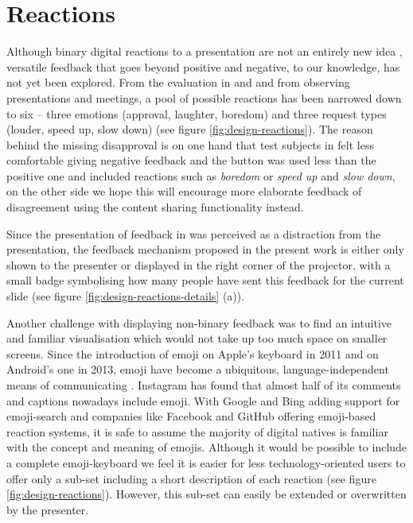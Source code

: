 \section{Reactions}
\label{sec:design-reactions}
Although binary digital reactions to a presentation are not an entirely new idea \cite{Teevan:MobileFeedbackDuringPresentation}, versatile feedback that goes beyond positive and negative, to our knowledge, has not yet been explored. From the evaluation in \cite{Teevan:MobileFeedbackDuringPresentation} and \cite{Isaacs:InteractivePresentationsDistributedAudience} and from observing presentations and meetings, a pool of possible reactions has been narrowed down to six --  three emotions (approval, laughter, boredom) and three request types (louder, speed up, slow down) (see figure \ref{fig:design-reactions}). The reason behind the missing disapproval is on one hand that test subjects in \cite{Teevan:MobileFeedbackDuringPresentation} felt less comfortable giving negative feedback and the button was used less than the positive one and included reactions such as \emph{boredom} or \emph{speed up} and \emph{slow down}, on the other side we hope this will encourage more elaborate feedback of disagreement using the content sharing functionality instead.

Since the presentation of feedback in \cite{Teevan:MobileFeedbackDuringPresentation} was perceived as a distraction from the presentation, the feedback mechanism proposed in the present work is either only shown to the presenter or displayed in the right corner of the projector, with a small badge symbolising how many people have sent this feedback for the current slide (see figure \ref{fig:design-reactions-details} (a)).

Another challenge with displaying non-binary feedback was to find an intuitive and familiar visualisation which would not take up too much space on smaller screens. Since the introduction of emoji on Apple's keyboard in 2011 and on Android's one in 2013, emoji have become a ubiquitous, language-independent means of communicating \cite{Instagramm:Emoji, Cappallo:EmojiVideoSearch}. Instagram has found that almost half of its comments and captions nowadays include emoji. With Google \cite{Google:Emoji} and Bing \cite{Bing:Emoji} adding support for emoji-search and companies like Facebook \cite{Facebook:Reactions} and GitHub \cite{Github:Reactions} offering emoji-based reaction systems, it is safe to assume the majority of digital natives is familiar with the concept and meaning of emojis. Although it would be possible to include a complete emoji-keyboard we feel it is easier for less technology-oriented users to offer only a sub-set including a short description of each reaction (see figure \ref{fig:design-reactions}). However, this sub-set can easily be extended or overwritten by the presenter.

